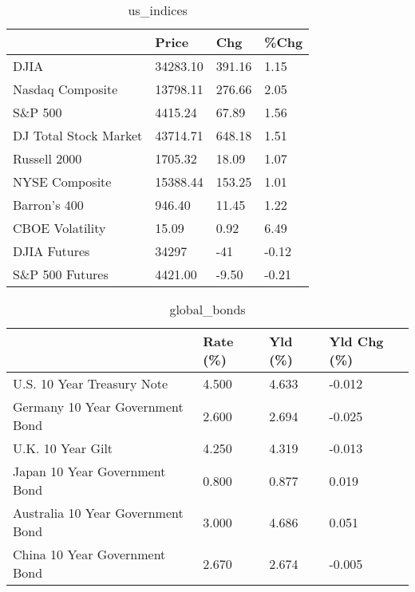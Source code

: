 \documentclass{article}%
\begin{document}
%


\begin{table}[htbp]%
\caption{us\_indices}%
\centering%
\begin{adjustbox}{width=1\textwidth}%
\begin{tabular}{llll}
\toprule
                      &    Price &    Chg &  \%Chg \\
\midrule
                 DJIA & 34283.10 & 391.16 &  1.15 \\
     Nasdaq Composite & 13798.11 & 276.66 &  2.05 \\
              S\&P 500 &  4415.24 &  67.89 &  1.56 \\
DJ Total Stock Market & 43714.71 & 648.18 &  1.51 \\
         Russell 2000 &  1705.32 &  18.09 &  1.07 \\
       NYSE Composite & 15388.44 & 153.25 &  1.01 \\
         Barron's 400 &   946.40 &  11.45 &  1.22 \\
      CBOE Volatility &    15.09 &   0.92 &  6.49 \\
         DJIA Futures &    34297 &    -41 & -0.12 \\
      S\&P 500 Futures &  4421.00 &  -9.50 & -0.21 \\
\bottomrule
\end{tabular}
%
\end{adjustbox}%
\end{table}

%


\begin{table}[htbp]%
\caption{global\_bonds}%
\centering%
\begin{adjustbox}{width=1\textwidth}%
\begin{tabular}{llll}
\toprule
                                  & Rate (\%) & Yld (\%) & Yld Chg (\%) \\
\midrule
       U.S. 10 Year Treasury Note &    4.500 &   4.633 &      -0.012 \\
  Germany 10 Year Government Bond &    2.600 &   2.694 &      -0.025 \\
                U.K. 10 Year Gilt &    4.250 &   4.319 &      -0.013 \\
    Japan 10 Year Government Bond &    0.800 &   0.877 &       0.019 \\
Australia 10 Year Government Bond &    3.000 &   4.686 &       0.051 \\
    China 10 Year Government Bond &    2.670 &   2.674 &      -0.005 \\
\bottomrule
\end{tabular}
%
\end{adjustbox}%
\end{table}
\end{document}
